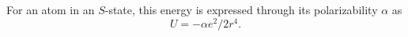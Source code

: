 For an atom in an $S$-state, this energy is expressed through its polarizability $\alpha$ as
\begin{equation}
U=-\alpha e^2/2r^4.
\tag{89.5}
\end{equation}
